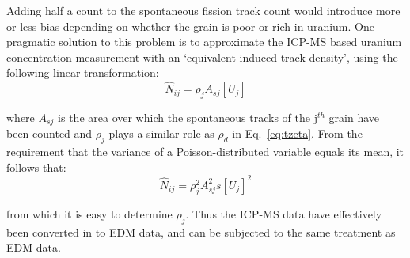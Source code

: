 \begin{refsection}
Adding half a count to the spontaneous fission track count would
introduce more or less bias depending on whether the grain is poor or
rich in uranium. One pragmatic solution to this problem is to
approximate the ICP-MS based uranium concentration measurement with an
`equivalent induced track density', using the following linear
transformation:
\begin{equation}
\hat{N}_{ij} = \rho_j A_{sj} [{U}_j]
\end{equation}

\noindent where $A_{sj}$ is the area over which the spontaneous tracks
of the j$^{th}$ grain have been counted and $\rho_j$ plays a similar
role as $\rho_d$ in Eq.~\ref{eq:tzeta}. From the requirement that the
variance of a Poisson-distributed variable equals its mean, it follows
that:
\begin{equation}
\hat{N}_{ij} = \rho_j^2 A_{sj}^2 s[{U}_j]^2
\end{equation}

\noindent from which it is easy to determine $\rho_j$. Thus the ICP-MS
data have effectively been converted in to EDM data, and can be
subjected to the same treatment as EDM data.

\printbibliography[heading=subbibliography]

\end{refsection}
